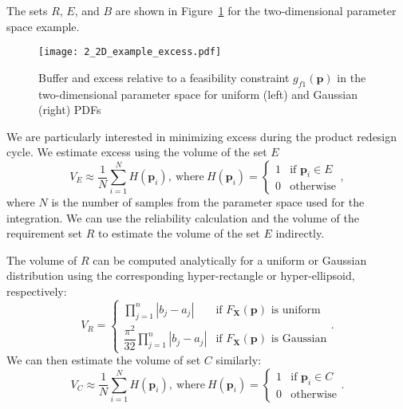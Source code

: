 The sets $R$, $E$, and $B$ are shown in Figure~\ref{fig:2Dexampleexcess} for the two-dimensional parameter space example.
%
\begin{figure}[h]
	\centering
	\texttt{[image: 2\_2D\_example\_excess.pdf]}
	\caption{Buffer and excess relative to a feasibility constraint $g_{f1}(\mathbf{p})$ in the two-dimensional parameter space for uniform (left) and Gaussian (right) \acp{PDF}}
	\label{fig:2Dexampleexcess}
\end{figure}

We are particularly interested in minimizing excess during the product redesign cycle. We estimate excess using the volume of the set $E$ 
%
\begin{equation} \label{eq:excessmontecarlo}
	V_E \approx \dfrac{1}{N} {\sum\limits_{i=1}^{N} H\left(\mathbf{p}_i\right)}, ~\mathrm{where}~ H\left(\mathbf{p}_i\right)={\begin{cases}1&{\text{if }}\mathbf{p}_i\in E\\0&{\text{otherwise}}\end{cases}},
\end{equation}
%
where $N$ is the number of samples from the parameter space used for the integration. We can use the reliability calculation and the volume of the requirement set $R$ to estimate the volume of the set $E$ indirectly. 

The volume of $R$ can be computed analytically for a uniform or Gaussian distribution using the corresponding hyper-rectangle or hyper-ellipsoid, respectively:
%
\begin{equation} \label{eq:Rmontecarlo}
	V_R = {\begin{cases} \prod\limits_{j=1}^{n} \left|b_j - a_j\right| &{\text{if }}F_\mathbf{X}(\mathbf{p})\text{ is uniform}\\\dfrac{\pi^2}{32}\prod\limits_{j=1}^{n} \left|b_j - a_j\right| &{\text{if }}F_\mathbf{X}(\mathbf{p})\text{ is Gaussian}\end{cases}}.
\end{equation}
%
We can then estimate the volume of set $C$ similarly:
%
\begin{equation} \label{eq:Cmontecarlo}
	V_C \approx \dfrac{1}{N} {\sum\limits_{i=1}^{N} H\left(\mathbf{p}_i\right)}, ~\mathrm{where}~ H\left(\mathbf{p}_i\right)={\begin{cases}1&{\text{if }}\mathbf{p}_i\in C\\0&{\text{otherwise}}\end{cases}}.
\end{equation}

